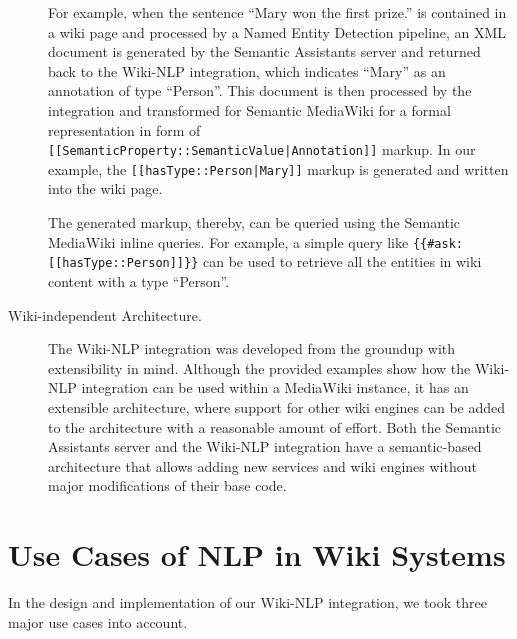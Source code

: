 \begin{description}
For example, when the sentence ``Mary won the first prize.'' is contained in a wiki page and processed by a Named Entity Detection pipeline, an XML document is generated by the Semantic Assistants server and returned back to the Wiki-NLP integration, which indicates ``Mary'' as an annotation of type ``Person''. This document is then processed by the integration and transformed for Semantic MediaWiki for a formal representation in form of \texttt{[[SemanticProperty::SemanticValue|Annotation]]} markup. In our example, the \texttt{[[hasType::Person|Mary]]} markup is generated and written into the wiki page.

The generated markup, thereby, can be queried using the Semantic MediaWiki inline queries. For example, a simple query like \texttt{\{\{\#ask: [[hasType::Person]]\}\}} can be used to retrieve all the entities in wiki content with a type ``Person''.

\item[Wiki-independent Architecture.] The Wiki-NLP integration was developed from the groundup with extensibility in mind. Although the provided examples show how the Wiki-NLP integration can be used within a MediaWiki instance, it has an extensible architecture, where support for other wiki engines can be added to the architecture with a reasonable amount of effort. Both the Semantic Assistants server and the Wiki-NLP integration have a semantic-based architecture that allows adding new services and wiki engines without major modifications of their base code.
\end{description}

\section{Use Cases of NLP in Wiki Systems}
In the design and implementation of our Wiki-NLP integration, we took three major use cases into account.


